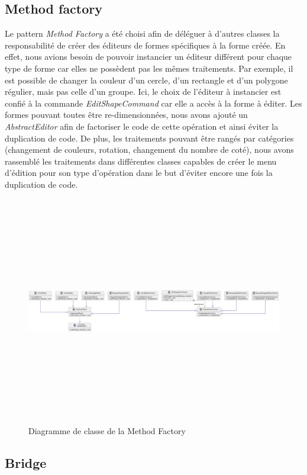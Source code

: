 \documentclass{article}
\begin{document}
\subsection{Method factory}
Le pattern \textit{Method Factory} a été choisi afin de déléguer à d'autres classes la responsabilité de créer des éditeurs de formes
spécifiques à la forme créée. En effet, nous avions besoin de pouvoir instancier un éditeur différent pour chaque type de forme car elles
ne possèdent pas les mêmes traitements. Par exemple, il est possible de changer la couleur d'un cercle, d'un rectangle et d'un polygone régulier, mais pas celle d'un groupe.
Ici, le choix de l'éditeur à instancier est confié à la commande \textit{EditShapeCommand} car elle a accès à la forme à éditer. Les formes pouvant toutes
être re-dimensionnées, nous avons ajouté un \textit{AbstractEditor} afin de factoriser le code de cette opération et ainsi éviter la duplication de code.
De plus, les traitements pouvant être rangés par catégories (changement de couleurs, rotation, changement du nombre de coté), nous avons rassemblé les traitements
dans différentes classes capables de créer le menu d'édition pour son type d'opération dans le but d'éviter encore une fois la duplication de code.
\begin{figure}[h]
    \centering
    \includegraphics[width=\textwidth,height=10.0cm,keepaspectratio]{methodFactory.png}
    \caption{Diagramme de classe de la Method Factory}
    \label{MethodFactory}
\end{figure}
\FloatBarrier
\subsection{Bridge}
\end{document}
